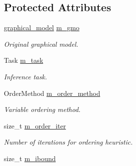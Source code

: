\subsection*{Protected Attributes}
\begin{DoxyCompactItemize}
\item 
\hyperlink{classmerlin_1_1graphical__model}{graphical\+\_\+model} \hyperlink{classmerlin_1_1wmb_a3aaf9e90947e65689d112c165f734b40}{m\+\_\+gmo}\hypertarget{classmerlin_1_1wmb_a3aaf9e90947e65689d112c165f734b40}{}\label{classmerlin_1_1wmb_a3aaf9e90947e65689d112c165f734b40}

\begin{DoxyCompactList}\small\item\em Original graphical model. \end{DoxyCompactList}\item 
Task \hyperlink{classmerlin_1_1wmb_ae015453f4b405e1ab4798d32a09fe63d}{m\+\_\+task}\hypertarget{classmerlin_1_1wmb_ae015453f4b405e1ab4798d32a09fe63d}{}\label{classmerlin_1_1wmb_ae015453f4b405e1ab4798d32a09fe63d}

\begin{DoxyCompactList}\small\item\em Inference task. \end{DoxyCompactList}\item 
Order\+Method \hyperlink{classmerlin_1_1wmb_ac9c473f2f6c6f727bc694a1ecb3cec16}{m\+\_\+order\+\_\+method}\hypertarget{classmerlin_1_1wmb_ac9c473f2f6c6f727bc694a1ecb3cec16}{}\label{classmerlin_1_1wmb_ac9c473f2f6c6f727bc694a1ecb3cec16}

\begin{DoxyCompactList}\small\item\em Variable ordering method. \end{DoxyCompactList}\item 
size\+\_\+t \hyperlink{classmerlin_1_1wmb_a56b67b58895055abf6e881a9ae3237c0}{m\+\_\+order\+\_\+iter}\hypertarget{classmerlin_1_1wmb_a56b67b58895055abf6e881a9ae3237c0}{}\label{classmerlin_1_1wmb_a56b67b58895055abf6e881a9ae3237c0}

\begin{DoxyCompactList}\small\item\em Number of iterations for ordering heuristic. \end{DoxyCompactList}\item 
size\+\_\+t \hyperlink{classmerlin_1_1wmb_a56f63e7abb2345db6cba7bb0a6572386}{m\+\_\+ibound}\hypertarget{classmerlin_1_1wmb_a56f63e7abb2345db6cba7bb0a6572386}{}\label{classmerlin_1_1wmb_a56f63e7abb2345db6cba7bb0a6572386}


\end{DoxyCompactItemize}
